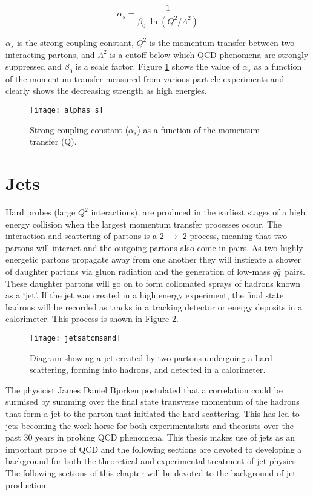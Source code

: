 \begin{equation}
\alpha_{s} = \frac{1}{\beta_{0} \; \ln(Q^{2}/\Lambda^{2} )}
\label{eq:alpha_s}
\end{equation}

\noindent
$\alpha_{s}$ is the strong coupling constant, $Q^{2}$ is the momentum transfer between two interacting partons, and $\Lambda^{2}$ is a cutoff below which QCD phenomena are strongly suppressed and $\beta_{0}$ is a scale factor.  Figure \ref{fig:as} shows the value of $\alpha_{s}$ as a function of the momentum transfer measured from various particle experiments and clearly shows the decreasing strength as high energies.

\begin{figure}[h]
\texttt{[image: alphas\_s]}
\centering
\caption{Strong coupling constant ($\alpha_{s}$) as a function of the momentum transfer (Q)\cite{CMS:2014mna}.}
\label{fig:as}
\end{figure}

\section{Jets}

Hard probes (large $Q^{2}$ interactions), are produced in the earliest stages of a high energy collision when the largest momentum transfer processes occur.  The interaction and scattering of partons is a 2 $\rightarrow$ 2 process, meaning that two partons will interact and the outgoing partons also come in pairs.  As two highly energetic partons propagate away from one another they will instigate a shower of daughter partons via gluon radiation and the generation of low-mass $q \bar{q}$\, pairs.  These daughter partons will go on to form collomated sprays of hadrons known as a `jet'.  If the jet was created in a high energy experiment, the final state hadrons will be recorded as tracks in a tracking detector or energy deposits in a calorimeter.  This process is shown in Figure \ref{fig:MakeAJet}.



\begin{figure}[h]
\texttt{[image: jetsatcmsand]}
\centering
\caption{Diagram showing a jet created by two partons undergoing a hard scattering, forming into hadrons, and detected in a calorimeter\cite{JetPic}.}
\label{fig:MakeAJet}
\end{figure}

The physicist James Daniel Bjorken postulated that a correlation could be surmised by summing over the final state transverse momentum of the hadrons that form a jet to the parton that initiated the hard scattering\cite{PhysRev.179.1547}\cite{Bjorken:1973kd}.  This has led to jets becoming the work-horse for both experimentalists and theorists over the past 30 years in probing QCD phenomena.  This thesis makes use of jets as an important probe of QCD and the following sections are devoted to developing a background for both the theoretical and experimental treatment of jet physics.  The following sections of this chapter will be devoted to the background of jet production.

